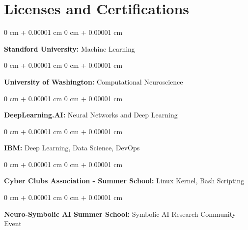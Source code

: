 \documentclass[10pt, letterpaper]{article}
\newenvironment{onecolentry}{
    \begin{adjustwidth}{
        0 cm + 0.00001 cm
    }{
        0 cm + 0.00001 cm
    }
}{
    \end{adjustwidth}
} %
\begin{document}
\section{Licenses and Certifications}

    \begin{onecolentry}
        \textbf{Standford University:} Machine Learning
    \end{onecolentry}
    \vspace{0.2 cm}

    \begin{onecolentry}
        \textbf{University of Washington:} Computational Neuroscience
    \end{onecolentry}
    \vspace{0.2 cm}

    \begin{onecolentry}
        \textbf{DeepLearning.AI:} Neural Networks and Deep Learning
    \end{onecolentry}
    \vspace{0.2 cm}

    \begin{onecolentry}
        \textbf{IBM:} Deep Learning, Data Science, DevOps
    \end{onecolentry}
    
    \vspace{0.2 cm}

    \begin{onecolentry}
        \textbf{Cyber Clubs Association - Summer School:} Linux Kernel, Bash Scripting
    \end{onecolentry}
    \vspace{0.2 cm}

    \begin{onecolentry}
        \textbf{Neuro-Symbolic AI Summer School:} Symbolic-AI Research Community Event
    \end{onecolentry}
    \vspace{0.2 cm}
\end{document}
